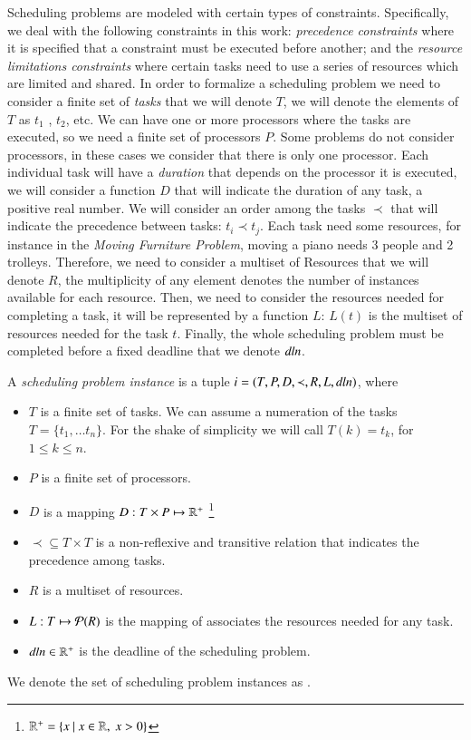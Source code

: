 Scheduling problems are modeled with certain types of constraints.
Specifically, we deal with the following constraints in this work:
\textit{precedence constraints} where it is specified that a constraint
must be executed before another; and the \textit{resource
  limitations constraints} where certain tasks need to use a series of
resources which are limited and shared. In order to formalize a
scheduling problem we need to consider a finite set of \emph{tasks} that we will
denote $T$, we will denote the elements of $T$ as $t_{1}$ , $t_{2}$,
etc.
We can have one or more processors where the tasks are executed, so we
need a finite set of processors $P$. Some problems do not consider
processors, in these cases we consider that there is only one processor.
Each individual task will have a \emph{duration} that depends on the
processor it is executed, we will
consider a function $D$ that will indicate the duration of any task, a
positive real number.
We will consider an order among the tasks $\prec$ that
will indicate the precedence between tasks: $t_{i}\prec t_{j}$.
Each task need some resources, for instance in the \emph{Moving
  Furniture Problem}, moving a piano needs
3 people and 2 trolleys. Therefore, we need to consider a multiset of
Resources that we will denote $R$,
the multiplicity of any element denotes the number of
instances available for each resource. Then, we need to consider the
resources needed for completing a task, it will be represented by a
function $L$: $L(t)$ is the multiset of resources needed for the task
$t$. Finally, the whole scheduling problem must be completed before a
fixed deadline that we denote $\mathit{dln}$.

\begin{definition}
  A \emph{scheduling problem instance} is a tuple $i=(T, P, D, \prec, R, L, \mathit{dln})$, where
  \begin{itemize}
  \item $T$ is a finite set of tasks. We can assume a numeration of
    the tasks $T=\{t_{1},\ldots t_{n}\}$. For the shake of simplicity
    we will call $T(k)=t_{k}$, for $1\leq k\leq n$.
  \item $P$ is a finite set of processors.
  \item $D$ is a mapping $D:T\times P\mapsto \mathbb{R}^{+}$
    \footnote{$\real^{+}=\{x\ |\ x\in\real,\ x>0\}$}
  \item $\prec\subseteq T\times T$ is a non-reflexive and transitive relation that
    indicates the precedence among tasks.
  \item $R$ is a multiset of resources.
  \item $L: T\mapsto{\cal P}(R)$ is the mapping of associates the
    resources needed for any task.
  \item $\mathit{dln}\in\mathbb{R}^{+}$ is the deadline of the scheduling problem.
  \end{itemize}
  We denote the set of scheduling problem instances as \SPI.
\end{definition}


